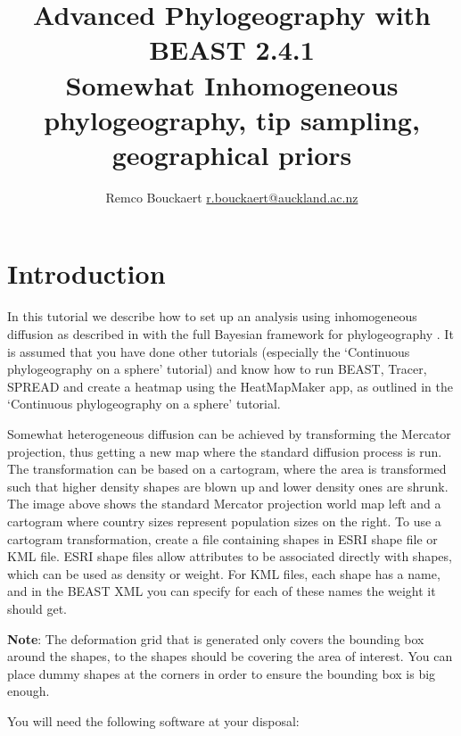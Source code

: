 \documentclass{article}
\newcommand{\BEASTVersion}{2.4.1}
\begin{document}
\title{Advanced Phylogeography with BEAST \BEASTVersion\\
    {\small Somewhat Inhomogeneous phylogeography, tip sampling, geographical priors}}
\author{Remco Bouckaert \url{r.bouckaert@auckland.ac.nz}}
\maketitle

\section{Introduction}


In this tutorial we describe how to set up an analysis using inhomogeneous diffusion as described in  \cite{somewhatIP} with the full Bayesian framework for phylogeography \cite{sphericalgeo}. It is assumed that you have done other tutorials (especially the `Continuous phylogeography on a sphere' tutorial) and know how to run BEAST, Tracer, SPREAD and create a heatmap using the HeatMapMaker app, as outlined in the `Continuous phylogeography on a sphere' tutorial.

Somewhat heterogeneous diffusion can be achieved by transforming the Mercator projection, thus getting a new map where the standard diffusion process is run. The transformation can be based on a cartogram, where the area is transformed such that higher density shapes are blown up and lower density ones are shrunk. The image above shows the standard Mercator projection world map left and a cartogram where country sizes represent population sizes on the right. To use a cartogram transformation, create a file containing shapes in ESRI shape file or KML file. ESRI shape files allow attributes to be associated directly with shapes, which can be used as density or weight. For KML files, each shape has a name, and in the BEAST XML you can specify for each of these names the weight it should get.

{\bf Note}: The deformation grid that is generated only covers the bounding box around the shapes, to the shapes should be covering the area of interest. You can place dummy shapes at the corners in order to ensure the bounding box is big enough.

You will need the following software at your disposal:
\end{document}
